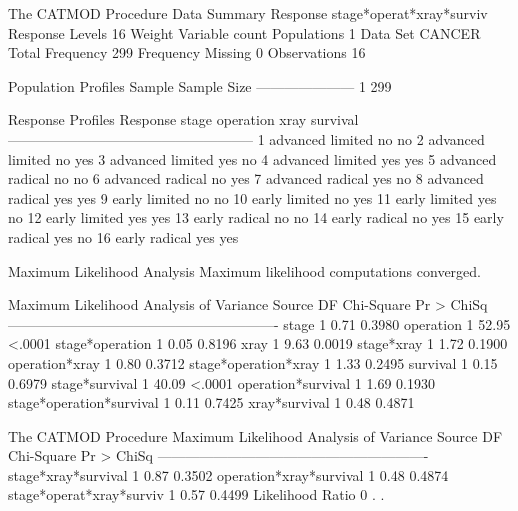 \documentclass{article}
\begin{document}
\begin{Woutput}
The CATMOD Procedure
                            Data Summary
Response           stage*operat*xray*surviv     Response Levels   16
Weight Variable    count                        Populations        1
Data Set           CANCER                       Total Frequency  299
Frequency Missing  0                            Observations      16

 Population Profiles
Sample    Sample Size
---------------------
    1             299

                  Response Profiles
Response    stage       operation    xray    survival
-----------------------------------------------------
    1       advanced    limited      no      no
    2       advanced    limited      no      yes
    3       advanced    limited      yes     no
    4       advanced    limited      yes     yes
    5       advanced    radical      no      no
    6       advanced    radical      no      yes
    7       advanced    radical      yes     no
    8       advanced    radical      yes     yes
    9       early       limited      no      no
   10       early       limited      no      yes
   11       early       limited      yes     no
   12       early       limited      yes     yes
   13       early       radical      no      no
   14       early       radical      no      yes
   15       early       radical      yes     no
   16       early       radical      yes     yes

                   Maximum Likelihood Analysis
           Maximum likelihood computations converged.

         Maximum Likelihood Analysis of Variance
Source                       DF   Chi-Square    Pr > ChiSq
----------------------------------------------------------
stage                         1         0.71        0.3980
operation                     1        52.95        <.0001
stage*operation               1         0.05        0.8196
xray                          1         9.63        0.0019
stage*xray                    1         1.72        0.1900
operation*xray                1         0.80        0.3712
stage*operation*xray          1         1.33        0.2495
survival                      1         0.15        0.6979
stage*survival                1        40.09        <.0001
operation*survival            1         1.69        0.1930
stage*operation*survival      1         0.11        0.7425
xray*survival                 1         0.48        0.4871

The CATMOD Procedure
         Maximum Likelihood Analysis of Variance
Source                       DF   Chi-Square    Pr > ChiSq
----------------------------------------------------------
stage*xray*survival           1         0.87        0.3502
operation*xray*survival       1         0.48        0.4874
stage*operat*xray*surviv      1         0.57        0.4499
Likelihood Ratio              0          .           .


\end{Woutput}
\end{document}
